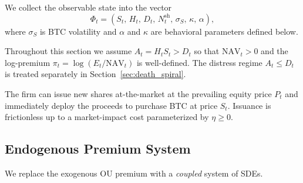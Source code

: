 We collect the observable state into the vector
\begin{equation}
  \label{eq:state_vector}
  \Phi_t = (S_t,\, H_t,\, D_t,\, N_t^{\mathrm{sh}},\, \sigma_S,\, \kappa,\, \alpha),
\end{equation}
where $\sigma_S$ is BTC volatility and $\alpha$ and $\kappa$ are behavioral
parameters defined below.

\begin{assumption}
  \label{ass:operating_regime}
  Throughout this section we assume $A_t = H_t S_t > D_t$ so that
  $\mathrm{NAV}_t > 0$ and the log-premium $\pi_t = \log(E_t/\mathrm{NAV}_t)$
  is well-defined.  The distress regime $A_t \le D_t$ is treated separately
  in Section~\ref{sec:death_spiral}.
\end{assumption}

\begin{assumption}
  \label{ass:issuance}
  The firm can issue new shares at-the-market at the prevailing equity price
  $P_t$ and immediately deploy the proceeds to purchase BTC at price $S_t$.
  Issuance is frictionless up to a market-impact cost parameterized by $\eta \ge 0$.
\end{assumption}

\subsection{Endogenous Premium System}
\label{sec:coupled_system}

We replace the exogenous OU premium with a \emph{coupled} system of SDEs.

